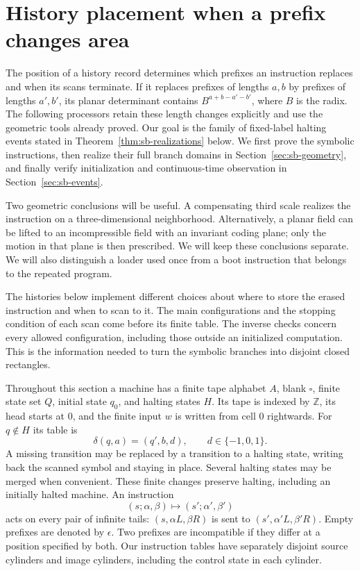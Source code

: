 \section{History placement when a prefix changes area}
\label{sec:sb-prefix}
The position of a history record determines which prefixes an instruction
replaces and when its scans terminate. If it replaces prefixes of lengths
$a,b$ by prefixes of lengths $a',b'$, its planar determinant contains
$B^{a+b-a'-b'}$, where $B$ is the radix. The following processors retain
these length changes explicitly and use the geometric tools already proved.
Our goal is the family of fixed-label halting events stated in
Theorem~\ref{thm:sb-realizations} below. We first prove the symbolic
instructions, then realize their full branch domains in
Section~\ref{sec:sb-geometry}, and finally verify initialization and
continuous-time observation in Section~\ref{sec:sb-events}.

Two geometric conclusions will be useful. A compensating third scale
realizes the instruction on a three-dimensional neighborhood. Alternatively,
a planar field can be lifted to an incompressible field with an invariant
coding plane; only the motion in that plane is then prescribed. We will
keep these conclusions separate. We will also distinguish a loader used
once from a boot instruction that belongs to the repeated program.

The histories below implement different choices about where to store
the erased instruction and when to scan to it. The main configurations
and the stopping condition of each scan come before its finite table.
The inverse checks concern every allowed configuration, including those
outside an initialized computation. This is the information needed to
turn the symbolic branches into disjoint closed rectangles.

Throughout this section a machine has a finite tape alphabet $A$, blank $\square$, finite state set $Q$, initial state $q_0$, and halting states $H$.  Its tape is indexed by $\mathbb Z$, its head starts at $0$, and the finite input $w$ is written from cell $0$ rightwards.  For $q\notin H$ its table is
\[
 \delta(q,a)=(q',b,d),\qquad d\in\{-1,0,1\}.
\]
A missing transition may be replaced by a transition to a halting state, writing back the scanned symbol and staying in place.  Several halting states may be merged when convenient.  These finite changes preserve halting, including an initially halted machine.  An instruction
\[
 (s;\alpha,\beta)\longmapsto(s';\alpha',\beta')
\]
acts on every pair of infinite tails: $(s,\alpha L,\beta R)$ is sent to $(s',\alpha'L,\beta'R)$.  Empty prefixes are denoted by $\epsilon$.  Two prefixes are incompatible if they differ at a position specified by both.  Our instruction tables have separately disjoint source cylinders and image cylinders, including the control state in each cylinder.


